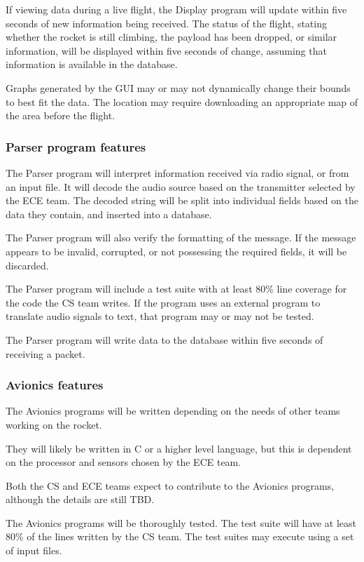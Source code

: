 \documentclass[onecolumn, draftclsnofoot, 10pt, compsoc]{IEEEtran}
\begin{document}
If viewing data during a live flight, the Display program will update within five seconds of new information being received.  The status of the flight, stating whether the rocket is still climbing, the payload has been dropped, or similar information, will be displayed within five seconds of change, assuming that information is available in the database.

Graphs generated by the GUI may or may not dynamically change their bounds to best fit the data.  The location may require downloading an appropriate map of the area before the flight.

\subsubsection{Parser program features}
The Parser program will interpret information received via radio signal, or from an input file. It will decode the audio source based on the transmitter selected by the ECE team.  The decoded string will be split into individual fields based on the data they contain, and inserted into a database.

The Parser program will also verify the formatting of the message. If the message appears to be invalid, corrupted, or not possessing the required fields, it will be discarded.

The Parser program will include a test suite with at least 80\% line coverage for the code the CS team writes.  If the program uses an external program to translate audio signals to text, that program may or may not be tested.

The Parser program will write data to the database within five seconds of receiving a packet.

\subsubsection{Avionics features}
The Avionics programs will be written depending on the needs of other teams working on the rocket.

They will likely be written in C or a higher level language, but this is dependent on the processor and sensors chosen by the ECE team.

Both the CS and ECE teams expect to contribute to the Avionics programs, although the details are still TBD.

The Avionics programs will be thoroughly tested. The test suite will have at least 80\% of the lines written by the CS team.  The test suites may execute using a set of input files.
\end{document}
